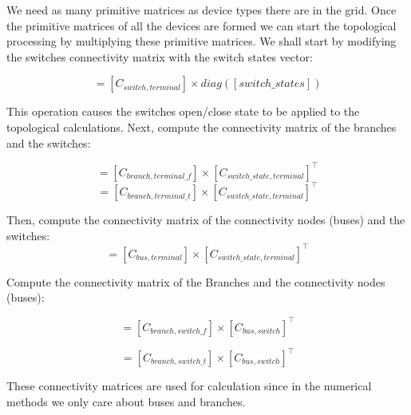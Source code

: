 \documentclass[nols,a4paper,twoside,symmetric,notoc,fleqn]{tufte-book}
\begin{document}
\vspace{1cm}

We need as many primitive matrices as device types there are in the grid. Once the primitive matrices of all the devices are formed we can start the topological processing by multiplying these primitive matrices. We shall start by modifying the switches connectivity matrix with the switch states vector:

\begin{equation}
	[C_{switch\_state,terminal}] = [C_{switch,terminal}] \times diag([switch\_states])
\end{equation}

This operation causes the switches open/close state to be applied to the topological calculations. Next, compute the connectivity matrix of the branches and the switches:

\begin{equation}
	[C_{branch, switch\_f}] = [C_{branch,terminal\_f}] \times [C_{switch\_state,terminal}]^\top
\end{equation}
\begin{equation}
	[C_{branch, switch\_t}] = [C_{branch,terminal\_t}] \times [C_{switch\_state,terminal}]^\top
\end{equation}

Then, compute the connectivity matrix of the connectivity nodes (buses) and the switches:
\begin{equation}
	[C_{bus, switch}] = [C_{bus,terminal}] \times [C_{switch\_state,terminal}]^\top
\end{equation}

Compute the connectivity matrix of the Branches and the connectivity nodes (buses):

\begin{equation}
	[C_f] = [C_{branch, switch\_f}]  \times [C_{bus, switch}]^\top
\end{equation}

\begin{equation}
	[C_t] = [C_{branch, switch\_t}]  \times [C_{bus, switch}]^\top
\end{equation}

These connectivity matrices are used for calculation since in the numerical methods we only care about buses and branches.
\end{document}
